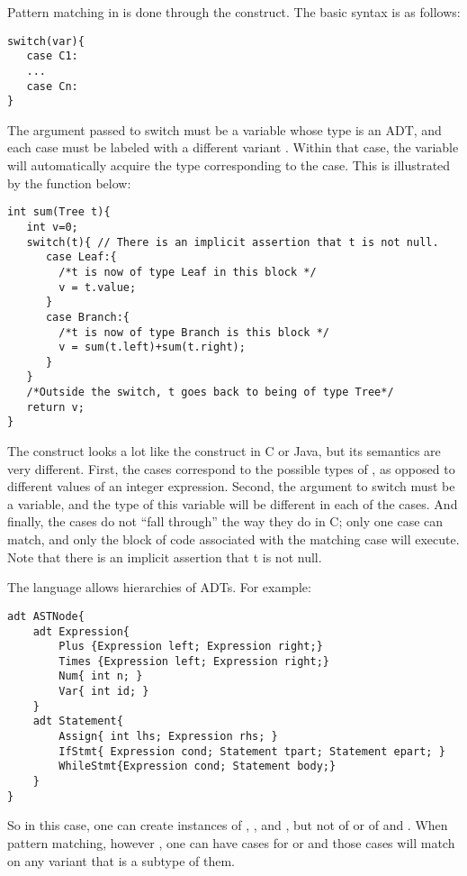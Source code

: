 Pattern matching in \Sk{} is done through the  construct. The basic syntax is as follows:
\begin{lstlisting}
switch(var){
   case C1:
   ...
   case Cn:
}
\end{lstlisting}
The argument  passed to switch must be a variable whose type is an ADT, and each case must be labeled with a different variant . Within that case, the variable  will automatically acquire the type corresponding to the case. This is illustrated by the function below:



\begin{lstlisting}
int sum(Tree t){
   int v=0;
   switch(t){ // There is an implicit assertion that t is not null.
      case Leaf:{
        /*t is now of type Leaf in this block */
        v = t.value;
      }
      case Branch:{
        /*t is now of type Branch is this block */
        v = sum(t.left)+sum(t.right);
      }
   }
   /*Outside the switch, t goes back to being of type Tree*/
   return v;
}
\end{lstlisting}
The  construct looks a lot like the  construct in C or Java, but its semantics are very different. First, the cases correspond to the possible types of , as opposed to different values of an integer expression. Second, the argument to switch must be a variable, and the type of this variable will be different in each of the cases. And finally, the cases do not ``fall through'' the way they do in C; only one case can match, and only the block of code associated with the matching case will execute. Note that there is an implicit assertion that t is not null.

The language allows hierarchies of ADTs. For example:
\begin{lstlisting}
adt ASTNode{
    adt Expression{
        Plus {Expression left; Expression right;}
        Times {Expression left; Expression right;}
        Num{ int n; }
        Var{ int id; }
    }
    adt Statement{
        Assign{ int lhs; Expression rhs; }
        IfStmt{ Expression cond; Statement tpart; Statement epart; }
        WhileStmt{Expression cond; Statement body;}
    }
}
\end{lstlisting}
So in this case, one can create instances of , ,  and , but not of  or of  and . When pattern matching, however , one can have cases for  or  and those cases will match on any variant that is a subtype of them.

